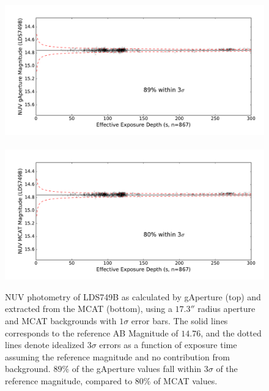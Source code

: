 \documentclass[preprint]{aastex}
\begin{document}
\begin{figure}[t!]
\includegraphics[scale=0.625]{Fig06a.pdf}\\\\
\includegraphics[scale=0.625]{Fig06b.pdf}
\caption{NUV photometry of LDS749B as calculated by gAperture (top) and extracted from the MCAT (bottom), using a $17.3''$ radius aperture and MCAT backgrounds with $1\sigma$ error bars. The solid lines corresponds to the reference AB Magnitude of $14.76$, and the dotted lines denote idealized $3\sigma$ errors as a function of exposure time assuming the reference magnitude and no contribution from background. $89\%$ of the gAperture values fall within $3\sigma$ of the reference magnitude, compared to $80\%$ of MCAT values.
\label{ldsabsphotnuv}}
\end{figure}
\clearpage
\end{document}
